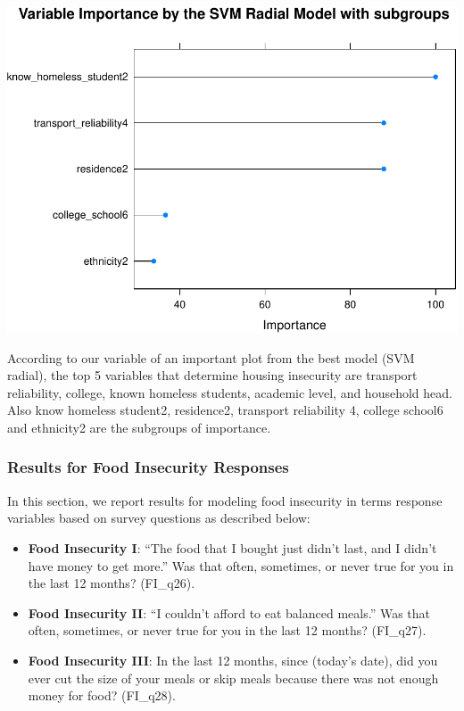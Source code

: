 \documentclass[
  10pt,
]{article}
\begin{document}
\begin{center}\includegraphics{final_phase2_report_files/figure-latex/unnamed-chunk-16-1} \end{center}

According to our variable of an important plot from the best model (SVM radial), the top 5 variables that determine housing insecurity are transport reliability, college, known homeless students, academic level, and household head. Also know homeless student2, residence2, transport reliability 4, college school6 and ethnicity2 are the subgroups of importance.\\

\hypertarget{results-for-food-insecurity-responses}{%
\subsubsection{Results for Food Insecurity Responses}\label{results-for-food-insecurity-responses}}

In this section, we report results for modeling food insecurity in terms response variables based on survey questions as described below:

\begin{itemize}
\item
  \textbf{Food Insecurity I}: ``The food that I bought just didn't last, and I didn't have money to get more.'' Was that often, sometimes, or never true for you in the last 12 months? (FI\_q26).
\item
  \textbf{Food Insecurity II}: ``I couldn't afford to eat balanced meals.'' Was that often, sometimes, or never true for you in the last 12 months? (FI\_q27).
\item
  \textbf{Food Insecurity III}: In the last 12 months, since (today's date), did you ever cut the size of your meals or skip meals because there was not enough money for food? (FI\_q28).
\end{itemize}
\end{document}
